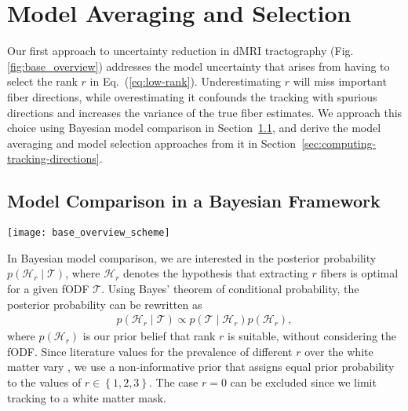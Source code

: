\section{Model Averaging and Selection}\label{sec:Models}

Our first approach to uncertainty reduction in dMRI tractography (Fig. \ref{fig:base_overview}) addresses the model uncertainty that arises from having to select the rank $r$ in Eq.~(\ref{eq:low-rank}). Underestimating $r$ will miss important fiber directions, while overestimating it confounds the tracking with spurious directions and increases the variance of the true fiber estimates. We approach this choice using Bayesian model comparison in Section~\ref{sec:model-comparison}, and derive the model averaging and model selection approaches from it in Section~\ref{sec:computing-tracking-directions}.

\subsection{Model Comparison in a Bayesian Framework}
\label{sec:model-comparison}
\begin{figure*}[t]
	\centering
	\texttt{[image: base\_overview\_scheme]}
	\caption{Computation of tracking directions via model averaging. For a given fODF $\mathcal{T}$, low-rank approximations with ranks $r \in \left\{ 1,2 , 3 \right\}$ are computed and their probabilities evaluated using the Bayesian framework described in Section \ref{sec:model-comparison}. The directions of the approximations are then aligned before an average is taken that minimizes the overall sum of angles between the resulting
weighted means $\mathbf{v}_i$ and their corresponding $\mathbf{v}_i^{\left( r
\right)}$. The final model is a sum of the three models weighted by posterior probability $p \left( \mathcal{T} \mid \mathcal{H}_r \right)$, as shown in Section \ref{sec:computing-tracking-directions}.}
	\label{fig:base_overview}
\end{figure*}
In Bayesian model comparison, we are interested in the
posterior probability $p \left( \mathcal{H}_r \mid \mathcal{T} \right)$, where
$\mathcal{H}_r$ denotes the hypothesis that extracting $r$ fibers is optimal for a given fODF $\mathcal{T}$. Using Bayes' theorem of
conditional probability, the posterior probability can be rewritten as
\begin{align}
	p \left( \mathcal{H}_r \mid \mathcal{T} \right) \propto p \left(
		\mathcal{T} \mid \mathcal{H}_r 
	\right) p \left(  \mathcal{H}_r \right), 
	\label{eq:Bayes}
\end{align}
where $p \left(  \mathcal{H}_r \right)$ is our prior belief that rank $r$ is
suitable, without considering the fODF. Since literature values for the prevalence of different $r$ over the white matter vary  \cite{BEHRENS2007144,Jeurissen:2012, Schultz:MICCAI12}, we use a
non-informative prior that assigns equal prior probability to the values of $r
\in \left\{ 1,2,3 \right\}$. The case $r=0$ can be excluded since we limit
tracking to a white matter mask. 

